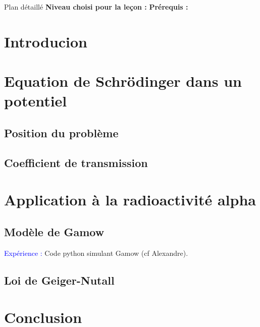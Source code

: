 \begin{reportBlock}{Plan détaillé}
  \textbf{Niveau choisi pour la leçon :} 
  \newline
  \textbf{Prérequis : }
  \newline

\section*{Introducion}

\section{Equation de Schrödinger dans un potentiel}

\subsection{Position du problème}

\subsection{Coefficient de transmission}

\section{Application à la radioactivité alpha}

\subsection{Modèle de Gamow}
\textcolor{blue}{Expérience :} Code python simulant Gamow (cf Alexandre).

\subsection{Loi de Geiger-Nutall}


\section*{Conclusion}


\end{reportBlock}